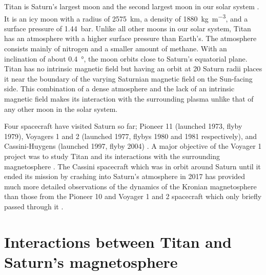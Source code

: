\documentclass[12pt, parskip=full*, abstract]{scrartcl}
\begin{document}
Titan is Saturn's largest moon and the second largest moon in our solar system \parencite{fundamental-planetary-science}. It is an icy moon with a radius of \SI{2575}{\kilo\metre}, a density of \SI{1880}{\kilogram\per\metre^3}, and a surface pressure of \SI{1.44}{\bar}. Unlike all other moons in our solar system, Titan has an atmosphere with a higher surface pressure than Earth's. The atmosphere consists mainly of nitrogen and a smaller amount of methane. With an inclination of about \SI{0.4}{\degree}, the moon orbits close to Saturn's equatorial plane. Titan has no intrinsic magnetic field but having an orbit at 20 Saturn radii places it near the boundary of the varying Saturnian magnetic field on the Sun-facing side. This combination of a dense atmosphere and the lack of an intrinsic magnetic field makes its interaction with the surrounding plasma unlike that of any other moon in the solar system. 

Four spacecraft have visited Saturn so far; Pioneer 11 (launched 1973, flyby 1979), Voyagers 1 and 2 (launched 1977, flybys 1980 and 1981 respectively), and Cassini-Huygens (launched 1997, flyby 2004) \parencite{encyclopedia-missions}. A major objective of the Voyager 1 project was to study Titan and its interactions with the surrounding magnetosphere \parencite{hartle-1982}. The Cassini spacecraft which was in orbit around Saturn until it ended its mission by crashing into Saturn's atmosphere in 2017 \parencite{cassini-2019} has provided much more detailed observations of the dynamics of the Kronian magnetosphere than those from the Pioneer 10 and Voyager 1 and 2 spacecraft which only briefly passed through it \parencite{encyclopedia-magnetospheres}. 


\section{Interactions between Titan and Saturn's magnetosphere}
\end{document}
